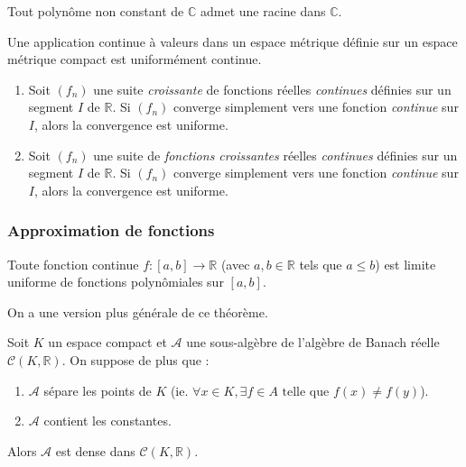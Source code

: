
	\begin{application}
		Tout polynôme non constant de $\mathbb{C}$ admet une racine dans $\mathbb{C}$.
	\end{application}

	\begin{theorem}[Heine]
		Une application continue à valeurs dans un espace métrique définie sur un espace métrique compact est uniformément continue.
	\end{theorem}


	\begin{theorem}
		\begin{enumerate}[label=(\roman*)]
			\item Soit $(f_n)$ une suite \textit{croissante} de fonctions réelles \textit{continues} définies sur un segment $I$ de $\mathbb{R}$. Si $(f_n)$ converge simplement vers une fonction \textit{continue} sur $I$, alors la convergence est uniforme.
			\item Soit $(f_n)$ une suite de \textit{fonctions croissantes} réelles \textit{continues} définies sur un segment $I$ de $\mathbb{R}$. Si $(f_n)$ converge simplement vers une fonction \textit{continue} sur $I$, alors la convergence est uniforme.
		\end{enumerate}
	\end{theorem}

	\subsubsection{Approximation de fonctions}


	\begin{theorem}[Weierstrass]
		Toute fonction continue $f : [a,b] \rightarrow \mathbb{R}$ (avec $a, b \in \mathbb{R}$ tels que $a \leq b$) est limite uniforme de fonctions polynômiales sur $[a, b]$.
	\end{theorem}

	On a une version plus générale de ce théorème.


	\begin{theorem}
		Soit $K$ un espace compact et $\mathcal{A}$ une sous-algèbre de l'algèbre de Banach réelle $\mathcal{C}(K, \mathbb{R})$. On suppose de plus que :
		\begin{enumerate}[label=(\roman*)]
			\item $\mathcal{A}$ sépare les points de $K$ (ie. $\forall x \in K, \exists f \in A \text{ telle que } f(x) \neq f(y)$).
			\item $\mathcal{A}$ contient les constantes.
		\end{enumerate}
		Alors $\mathcal{A}$ est dense dans $\mathcal{C}(K, \mathbb{R})$.
	\end{theorem}

